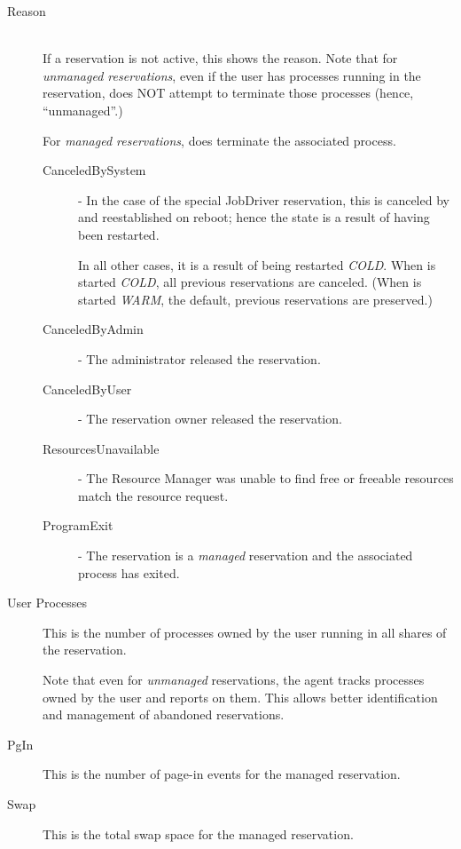 \begin{description}
\item[Reason] \hfill \\


  If a reservation is not active, this shows the reason.  Note that for
  {\em unmanaged reservations}, even if the user has processes running in the
  reservation, {\DUCC} does NOT attempt to terminate those processes (hence, ``unmanaged''.)

  For {\em managed reservations}, {\DUCC} does terminate the associated process.

  \begin{description}
  \item[CanceledBySystem] - In the case of the special JobDriver reservation, this is
    canceled by {\DUCC} and reestablished on reboot; hence the state is a result of {\DUCC}
    having been restarted.

    In all other cases, it is a result of {\DUCC} being restarted {\em COLD}.  When
    {\DUCC} is started {\em COLD}, all previous reservations are canceled.  (When {\DUCC}
    is started {\em WARM}, the default, previous reservations are preserved.)
  \item[CanceledByAdmin] - The {\DUCC} administrator released the reservation. 
  \item[CanceledByUser] - The reservation owner released the reservation. 
  \item[ResourcesUnavailable] - The Resource Manager was unable to find free or freeable resources 
    match the resource request. 
  \item[ProgramExit] - The reservation is a {\em managed} reservation and the associated
    process has exited.
  \end{description}

\item[User Processes] This is the number of processes owned by the user running in all
  shares of the reservation.  
  
  Note that even for {\em unmanaged} reservations, the {\DUCC} agent tracks processes owned
  by the user and reports on them.  This allows better identification and management of
  abandoned reservations.
          
\item[PgIn] This is the number of page-in events for the managed reservation.

\item[Swap] This is the total swap space for the managed reservation.


\end{description}
